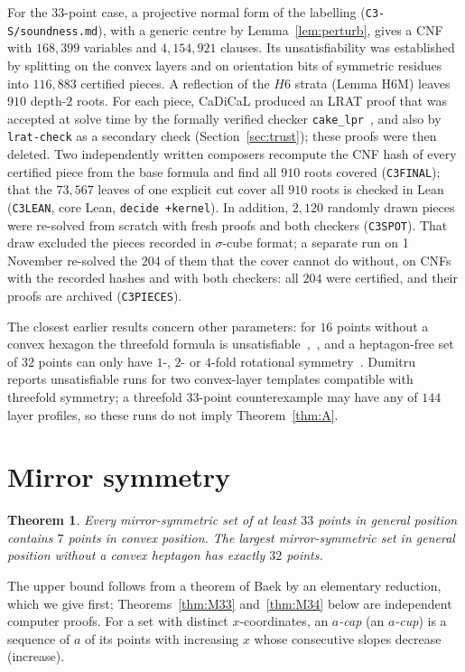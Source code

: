 \documentclass[11pt]{article}
\newtheorem{theorem}{Theorem}
\theoremstyle{remark}
\begin{document}
For the $33$-point case, a projective normal form of the labelling (\texttt{C3-S/soundness.md}), with a generic centre by
Lemma~\ref{lem:perturb}, gives a CNF with $168{,}399$ variables and $4{,}154{,}921$ clauses. Its unsatisfiability was
established by splitting on the convex layers and on orientation bits of symmetric residues into $116{,}883$ certified
pieces. A reflection of the $H6$ strata (Lemma H6M) leaves $910$ depth-$2$ roots. For each piece, CaDiCaL produced an LRAT
proof that was accepted at solve time by the formally verified checker \texttt{cake\_lpr}~\cite{THM21}, and also by
\texttt{lrat-check} as a secondary check (Section~\ref{sec:trust}); these proofs were then deleted. Two independently written composers recompute the CNF
hash of every certified piece from the base formula and find all $910$ roots covered (\texttt{C3FINAL}); that the
$73{,}567$ leaves of one explicit cut cover all $910$ roots is checked in Lean (\texttt{C3LEAN}, core Lean,
\texttt{decide +kernel}). In addition, $2{,}120$ randomly drawn pieces were re-solved from scratch with fresh proofs and
both checkers (\texttt{C3SPOT}). That draw excluded the pieces recorded in $\sigma$-cube format; a separate run on
1 November re-solved the $204$ of them that the cover cannot do without, on CNFs with the recorded hashes and with both
checkers: all $204$ were certified, and their proofs are archived (\texttt{C3PIECES}).

The closest earlier results concern other parameters: for $16$ points without a convex hexagon the threefold formula is
unsatisfiable~\cite[\S6.1]{SMQH25},~\cite{Mac25}, and a heptagon-free set of $32$ points can only have $1$-, $2$- or
$4$-fold rotational symmetry~\cite[\S6.2]{SMQH25}. Dumitru~\cite[Table~1]{Dum25} reports unsatisfiable runs for two
convex-layer templates compatible with threefold symmetry; a threefold $33$-point counterexample may have any of $144$
layer profiles, so these runs do not imply Theorem~\ref{thm:A}.

\section{Mirror symmetry}\label{sec:mirror}
\begin{theorem}\label{thm:M}
Every mirror-symmetric set of at least $33$ points in general position contains $7$ points in convex position. The largest
mirror-symmetric set in general position without a convex heptagon has exactly $32$ points.
\end{theorem}
The upper bound follows from a theorem of Baek by an elementary reduction, which we give first;
Theorems~\ref{thm:M33} and~\ref{thm:M34} below are independent computer proofs. For a set with distinct
$x$-coordinates, an \emph{$a$-cap} (an \emph{$a$-cup}) is a sequence of $a$ of its points with increasing $x$ whose
consecutive slopes decrease (increase).
\end{document}
